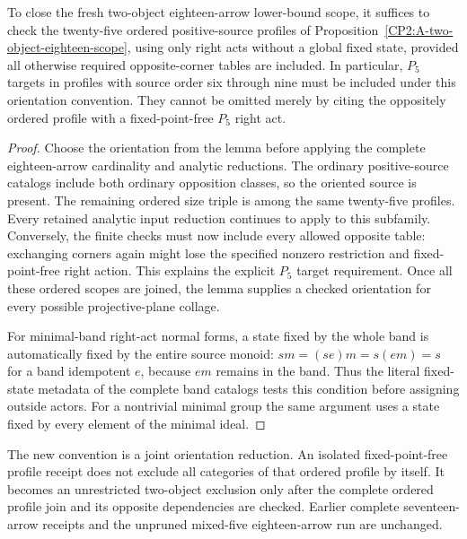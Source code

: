 \begin{corollary}
\label{CP2:A-two-object-eighteen-oriented-scope}
To close the fresh two-object eighteen-arrow lower-bound
scope, it suffices to check the twenty-five ordered
positive-source profiles of
Proposition~\ref{CP2:A-two-object-eighteen-scope}, using
only right acts without a global fixed state, provided
all otherwise required opposite-corner tables are included.
In particular, $P_5$ targets in profiles with source order
six through nine must be included under this orientation
convention. They cannot be omitted merely by citing the
oppositely ordered profile with a fixed-point-free $P_5$
right act.
\end{corollary}
\begin{proof}
Choose the orientation from the lemma before applying
the complete eighteen-arrow cardinality and analytic
reductions. The ordinary positive-source catalogs include
both ordinary opposition classes, so the oriented source
is present. The remaining ordered size triple is among
the same twenty-five profiles. Every retained analytic
input reduction continues to apply to this subfamily.
Conversely, the finite checks must now include every
allowed opposite table: exchanging corners again might
lose the specified nonzero restriction and fixed-point-free
right action. This explains the explicit $P_5$ target
requirement. Once all these ordered scopes are joined,
the lemma supplies a checked orientation for every
possible projective-plane collage.

For minimal-band right-act normal forms, a state fixed
by the whole band is automatically fixed by the entire
source monoid: $sm=(se)m=s(em)=s$ for a band idempotent
$e$, because $em$ remains in the band. Thus the literal
fixed-state metadata of the complete band catalogs
tests this condition before assigning outside actors.
For a nontrivial minimal group the same argument uses
a state fixed by every element of the minimal ideal.
\end{proof}

\begin{remark*}
The new convention is a joint orientation reduction.
An isolated fixed-point-free profile receipt does not
exclude all categories of that ordered profile by itself.
It becomes an unrestricted two-object exclusion only
after the complete ordered profile join and its opposite
dependencies are checked. Earlier complete seventeen-arrow
receipts and the unpruned mixed-five eighteen-arrow run
are unchanged.
\end{remark*}
